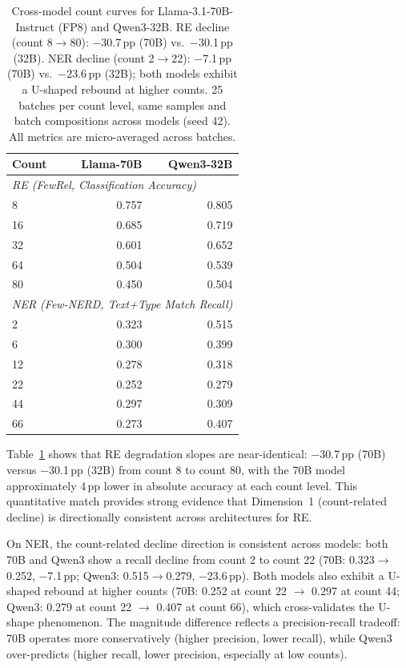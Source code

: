 \documentclass[11pt]{article}
\begin{document}
\begin{table}[h]
\centering
\small
\caption{Cross-model count curves for Llama-3.1-70B-Instruct (FP8) and Qwen3-32B. RE decline (count 8$\to$80): $-$30.7\,pp (70B) vs.\ $-$30.1\,pp (32B). NER decline (count 2$\to$22): $-$7.1\,pp (70B) vs.\ $-$23.6\,pp (32B); both models exhibit a U-shaped rebound at higher counts. 25 batches per count level, same samples and batch compositions across models (seed 42). All metrics are micro-averaged across batches.}
\label{tab:cross_model_70b}
\begin{tabular}{lrr}
\toprule
\textbf{Count} & \textbf{Llama-70B} & \textbf{Qwen3-32B} \\
\midrule
\multicolumn{3}{l}{\textit{RE (FewRel, Classification Accuracy)}} \\
8  & 0.757 & 0.805 \\
16 & 0.685 & 0.719 \\
32 & 0.601 & 0.652 \\
64 & 0.504 & 0.539 \\
80 & 0.450 & 0.504 \\
\midrule
\multicolumn{3}{l}{\textit{NER (Few-NERD, Text+Type Match Recall)}} \\
2  & 0.323 & 0.515 \\
6  & 0.300 & 0.399 \\
12 & 0.278 & 0.318 \\
22 & 0.252 & 0.279 \\
44 & 0.297 & 0.309 \\
66 & 0.273 & 0.407 \\
\bottomrule
\end{tabular}
\end{table}

Table~\ref{tab:cross_model_70b} shows that RE degradation slopes are near-identical: $-$30.7\,pp (70B) versus $-$30.1\,pp (32B) from count 8 to count 80, with the 70B model approximately 4\,pp lower in absolute accuracy at each count level. This quantitative match provides strong evidence that Dimension~1 (count-related decline) is directionally consistent across architectures for RE.

On NER, the count-related decline direction is consistent across models: both 70B and Qwen3 show a recall decline from count 2 to count 22 (70B: 0.323$\to$0.252, $-$7.1\,pp; Qwen3: 0.515$\to$0.279, $-$23.6\,pp). Both models also exhibit a U-shaped rebound at higher counts (70B: 0.252 at count 22 $\to$ 0.297 at count 44; Qwen3: 0.279 at count 22 $\to$ 0.407 at count 66), which cross-validates the U-shape phenomenon. The magnitude difference reflects a precision-recall tradeoff: 70B operates more conservatively (higher precision, lower recall), while Qwen3 over-predicts (higher recall, lower precision, especially at low counts).
\end{document}
